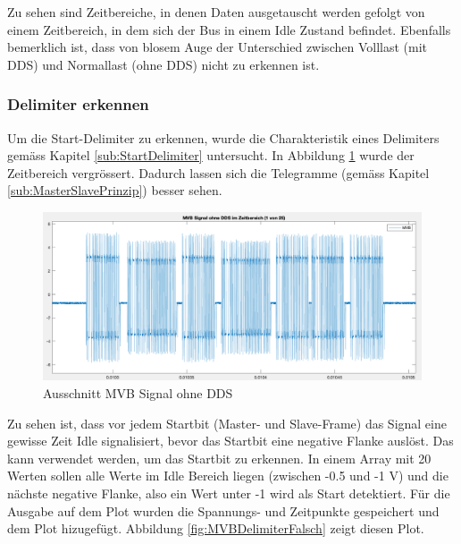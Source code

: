 Zu sehen sind Zeitbereiche, in denen Daten ausgetauscht werden gefolgt von einem Zeitbereich, in dem sich der Bus in einem Idle Zustand befindet. Ebenfalls bemerklich ist, dass von blosem Auge der Unterschied zwischen Volllast (mit DDS) und Normallast (ohne DDS) nicht zu erkennen ist.

\subsubsection{Delimiter erkennen}
Um die Start-Delimiter zu erkennen, wurde die Charakteristik eines Delimiters gemäss Kapitel \ref{sub:StartDelimiter} untersucht. In Abbildung \ref{fig:AusschnittMvbOhneDds} wurde der Zeitbereich vergrössert. Dadurch lassen sich die Telegramme (gemäss Kapitel \ref{sub:MasterSlavePrinzip}) besser sehen.

\begin{figure}[H]
    \centering
    \includegraphics[width=0.9\linewidth]{Figures/Chap3/Busauslastung/Ausschnitt_MVB_ohneDDS.png}
    \caption{Ausschnitt MVB Signal ohne DDS}
    \label{fig:AusschnittMvbOhneDds}
\end{figure}

Zu sehen ist, dass vor jedem Startbit (Master- und Slave-Frame) das Signal eine gewisse Zeit Idle signalisiert, bevor das Startbit eine negative Flanke auslöst. Das kann verwendet werden, um das Startbit zu erkennen. In einem Array mit 20 Werten sollen alle Werte im Idle Bereich liegen (zwischen -0.5 und -1 V) und die nächste negative Flanke, also ein Wert unter -1 wird als Start detektiert. Für die Ausgabe auf dem Plot wurden die Spannungs- und Zeitpunkte gespeichert und dem Plot hizugefügt. Abbildung \ref{fig:MVBDelimiterFalsch} zeigt diesen Plot.

